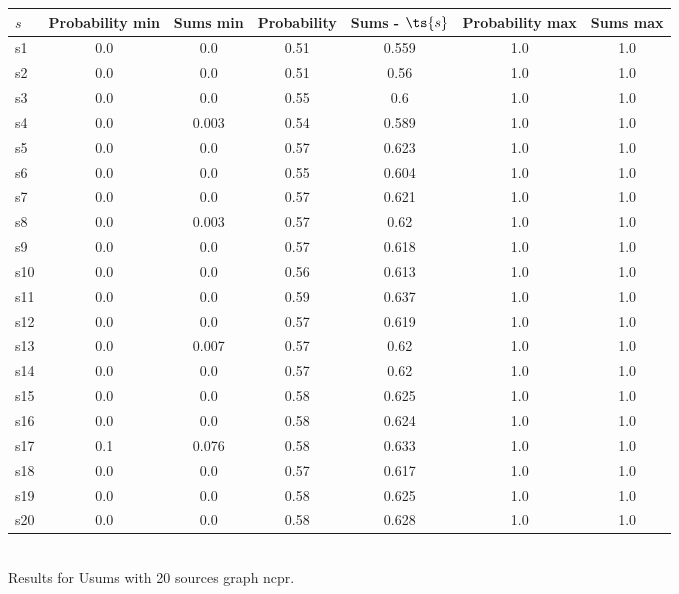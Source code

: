 \documentclass{article}
\begin{document}
\noindent\begin{tabular}{|l|c|c|c|c|c|c|}
\hline
$s$& Probability min & Sums min & Probability & Sums - $\ts{s}$ & Probability max & Sums max\\
\hline
s1 &0.0 & 0.0 & 0.51 & 0.559 & 1.0 & 1.0\\
\hline
s2 &0.0 & 0.0 & 0.51 & 0.56 & 1.0 & 1.0\\
\hline
s3 &0.0 & 0.0 & 0.55 & 0.6 & 1.0 & 1.0\\
\hline
s4 &0.0 & 0.003 & 0.54 & 0.589 & 1.0 & 1.0\\
\hline
s5 &0.0 & 0.0 & 0.57 & 0.623 & 1.0 & 1.0\\
\hline
s6 &0.0 & 0.0 & 0.55 & 0.604 & 1.0 & 1.0\\
\hline
s7 &0.0 & 0.0 & 0.57 & 0.621 & 1.0 & 1.0\\
\hline
s8 &0.0 & 0.003 & 0.57 & 0.62 & 1.0 & 1.0\\
\hline
s9 &0.0 & 0.0 & 0.57 & 0.618 & 1.0 & 1.0\\
\hline
s10 &0.0 & 0.0 & 0.56 & 0.613 & 1.0 & 1.0\\
\hline
s11 &0.0 & 0.0 & 0.59 & 0.637 & 1.0 & 1.0\\
\hline
s12 &0.0 & 0.0 & 0.57 & 0.619 & 1.0 & 1.0\\
\hline
s13 &0.0 & 0.007 & 0.57 & 0.62 & 1.0 & 1.0\\
\hline
s14 &0.0 & 0.0 & 0.57 & 0.62 & 1.0 & 1.0\\
\hline
s15 &0.0 & 0.0 & 0.58 & 0.625 & 1.0 & 1.0\\
\hline
s16 &0.0 & 0.0 & 0.58 & 0.624 & 1.0 & 1.0\\
\hline
s17 &0.1 & 0.076 & 0.58 & 0.633 & 1.0 & 1.0\\
\hline
s18 &0.0 & 0.0 & 0.57 & 0.617 & 1.0 & 1.0\\
\hline
s19 &0.0 & 0.0 & 0.58 & 0.625 & 1.0 & 1.0\\
\hline
s20 &0.0 & 0.0 & 0.58 & 0.628 & 1.0 & 1.0\\
\hline
\end{tabular}\\

\noindent Results for Usums with 20 sources graph ncpr.
\end{document}
